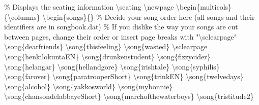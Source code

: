 \documentclass{article}%
\begin{document}
\% Displays the seating information\newline%
\textbackslash{}seating\newline%
\newline%
\textbackslash{}newpage\newline%
\textbackslash{}begin\{multicols\}\{\textbackslash{}columns\}\newline%
\textbackslash{}begin\{songs\}\{\}\newline%
\newline%
\% Decide your song order here (all songs and their identifiers are in songbook.dat)\newline%
\% If you dislike the way your songs are cut between pages, change their order or insert page breaks with "\textbackslash{}sclearpage"\newline%
\newline%
\textbackslash{}song\{dearfriends\}\newline%
\textbackslash{}song\{thisfeeling\}\newline%
\textbackslash{}song\{wasted\}\newline%
\textbackslash{}sclearpage\newline%
\textbackslash{}song\{henkilokuntaEN\}\newline%
\textbackslash{}song\{drunkenstudent\}\newline%
\textbackslash{}song\{fizzycider\}\newline%
\textbackslash{}song\{helangar\}\newline%
\textbackslash{}song\{hellandgore\}\newline%
\textbackslash{}song\{irishtale\}\newline%
\textbackslash{}song\{syphilis\}\newline%
\textbackslash{}song\{farover\}\newline%
\textbackslash{}song\{paratrooperShort\}\newline%
\textbackslash{}song\{trinkEN\}\newline%
\textbackslash{}song\{twelvedays\}\newline%
\textbackslash{}song\{alcohol\}\newline%
\textbackslash{}song\{yakkosworld\}\newline%
\textbackslash{}song\{mybonnie\}\newline%
\textbackslash{}song\{chansondelabbayeShort\}\newline%
\textbackslash{}song\{marchofthewaterboys\}\newline%
\textbackslash{}song\{tristitude2\}\newline%
\end{document}
